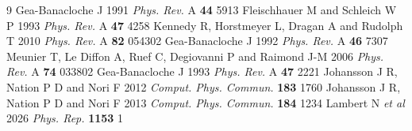 \documentclass{iopjournal}
\begin{document}
\begin{thebibliography}{9}
 Gea-Banacloche J 1991 {\it Phys. Rev.} A {\bf 44} 5913
 Fleischhauer M and Schleich W P 1993 {\it Phys. Rev.} A {\bf 47} 4258
 Kennedy R, Horstmeyer L, Dragan A and Rudolph T 2010 {\it Phys. Rev.} A {\bf 82} 054302
 Gea-Banacloche J 1992 {\it Phys. Rev.} A {\bf 46} 7307
 Meunier T, Le Diffon A, Ruef C, Degiovanni P and Raimond J-M 2006 {\it Phys. Rev.} A {\bf 74} 033802
 Gea-Banacloche J 1993 {\it Phys. Rev.} A {\bf 47} 2221
 Johansson J R, Nation P D and Nori F 2012 {\it Comput. Phys. Commun.} {\bf 183} 1760
 Johansson J R, Nation P D and Nori F 2013 {\it Comput. Phys. Commun.} {\bf 184} 1234
 Lambert N {\it et al} 2026 {\it Phys. Rep.} {\bf 1153} 1
\end{thebibliography}
\end{document}
